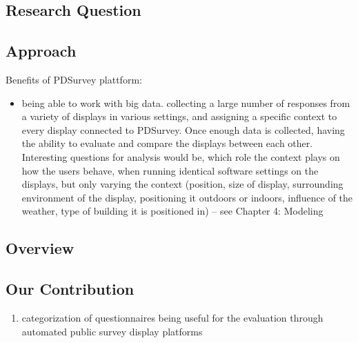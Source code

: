 \subsection{Research Question}



\subsection{Approach}



Benefits of PDSurvey plattform:

\begin{itemize}
\item being able to work with big data. collecting a large number of responses from a variety of displays in various settings, and assigning a specific context to every display connected to PDSurvey. Once enough data is collected, having the ability to evaluate and compare the displays between each other. Interesting questions for analysis would be, which role the context plays on how the users behave, when running identical software settings on the displays, but only varying the context (position, size of display, surrounding environment of the display, positioning it outdoors or indoors, influence of the weather, type of building it is positioned in) -- see Chapter 4: Modeling
\end{itemize}


\subsection{Overview}



\subsection{Our Contribution}

\begin{enumerate}
\item categorization of questionnaires being useful for the evaluation through automated public survey display platforms

\end{enumerate}







